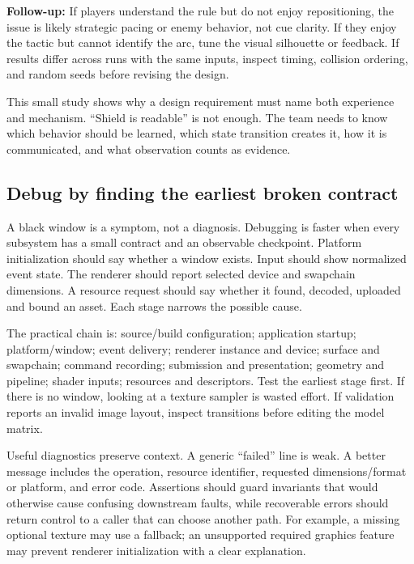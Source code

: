 \textbf{Follow-up:} If players understand the rule but do not enjoy repositioning, the issue is likely strategic pacing or enemy behavior, not cue clarity. If they enjoy the tactic but cannot identify the arc, tune the visual silhouette or feedback. If results differ across runs with the same inputs, inspect timing, collision ordering, and random seeds before revising the design.

This small study shows why a design requirement must name both experience and mechanism. ``Shield is readable'' is not enough. The team needs to know which behavior should be learned, which state transition creates it, how it is communicated, and what observation counts as evidence.

\subsection{Debug by finding the earliest broken contract}\label{06-engine-ii-ch041-debug-by-finding-the-earliest-broken-contract}

\hypertarget{06-engine-ii-ch041-debug-by-finding-the-earliest-broken-contract}{}

A black window is a symptom, not a diagnosis. Debugging is faster when every subsystem has a small contract and an observable checkpoint. Platform initialization should say whether a window exists. Input should show normalized event state. The renderer should report selected device and swapchain dimensions. A resource request should say whether it found, decoded, uploaded and bound an asset. Each stage narrows the possible cause.

The practical chain is: source/build configuration; application startup; platform/window; event delivery; renderer instance and device; surface and swapchain; command recording; submission and presentation; geometry and pipeline; shader inputs; resources and descriptors. Test the earliest stage first. If there is no window, looking at a texture sampler is wasted effort. If validation reports an invalid image layout, inspect transitions before editing the model matrix.

Useful diagnostics preserve context. A generic ``failed'' line is weak. A better message includes the operation, resource identifier, requested dimensions/format or platform, and error code. Assertions should guard invariants that would otherwise cause confusing downstream faults, while recoverable errors should return control to a caller that can choose another path. For example, a missing optional texture may use a fallback; an unsupported required graphics feature may prevent renderer initialization with a clear explanation.

